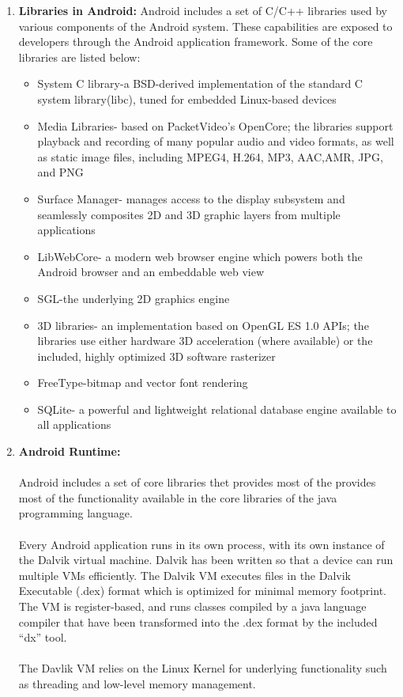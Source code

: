 \begin{itemize}
\begin{enumerate}
\item \textbf{Libraries in Android:}
Android includes a set of C/C++ libraries used by various components of the Android system. These capabilities are exposed to developers through the Android application
framework. Some of the core libraries are listed below:
    \begin{itemize}
     \item System C library-a BSD-derived implementation of the standard C system library(libc), tuned for embedded Linux-based devices
     \item Media Libraries- based on PacketVideo's OpenCore; the libraries support playback and recording of many popular audio and video formats, as well as
static image files, including MPEG4, H.264, MP3, AAC,AMR, JPG, and PNG
     \item Surface Manager- manages access to the display subsystem and seamlessly composites 2D and 3D graphic layers from multiple applications
     \item LibWebCore- a modern web browser engine which powers both the Android browser and an embeddable web view
     \item SGL-the underlying 2D graphics engine
     \item 3D libraries- an implementation based on OpenGL ES 1.0 APIs; the libraries use either hardware 3D acceleration (where available) or the included,
highly optimized 3D software rasterizer 
     \item FreeType-bitmap and vector font rendering 
     \item SQLite- a powerful and lightweight relational database engine available to all applications
    \end{itemize}

\item \textbf{Android Runtime:}
      \paragraph{}Android includes a set of core libraries thet provides most of the provides most of the functionality available in the core libraries of 
the java programming language.
      \paragraph{}Every Android application runs in its own process, with its own instance of the Dalvik virtual machine. Dalvik has been written so that
a device can run multiple VMs efficiently. The Dalvik VM executes files in the Dalvik Executable (.dex) format which is optimized for minimal memory footprint.
The VM is register-based, and runs classes compiled by a java language compiler that have been transformed into the .dex format by the included ``dx'' tool.
      \paragraph{}The Davlik VM relies on the Linux Kernel for underlying functionality such as threading and low-level memory management.

  \end{enumerate}


\end{itemize}
